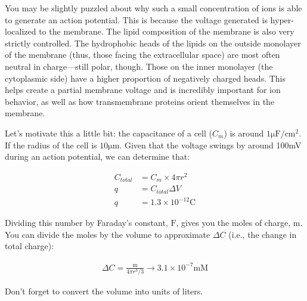 \documentclass[12pt]{report}
\begin{document}
You may be slightly puzzled about why such a small concentration of ions is able to generate an action potential. This is because the voltage generated is hyper-localized to the membrane. The lipid composition of the membrane is also very strictly controlled. The hydrophobic heads of the lipids on the outside monolayer of the membrane (thus, those facing the extracellular space) are most often neutral in charge---still polar, though. Those on the inner monolayer (the cytoplasmic side) have a higher proportion of negatively charged heads. This helps create a partial membrane voltage and is incredibly important for ion behavior, as well as how transmembrane proteins orient themselves in the membrane.\newline

Let's motivate this a little bit: the capacitance of a cell ($C_m$) is around $1\mathrm{\mu F}/\mathrm{cm}^2$. If the radius of the cell is $10\mathrm{\mu m}$. Given that the voltage swings by around 100mV during an action potential, we can determine that:


\begin{equation} \label{smallchange1}
\begin{split}
C_{total} &= C_m \times 4\pi r^2\\
q &= C_{total}\Delta V \\
q &= 1.3 \times 10^{-12}\mathrm{C}
\end{split}
\end{equation}

\bigskip

Dividing this number by Faraday's constant, $\mathrm{F}$, gives you the moles of charge, $\mathrm{m}$. You can divide the moles by the volume to approximate $\Delta C$ (i.e., the change in total charge):

\begin{equation} \label{eq8}
\begin{split}
\Delta C = \frac{\mathrm{m}}{4\pi r^3 /3} \rightarrow 3.1 \times 10^{-7} \mathrm{mM}
\end{split}
\end{equation}

Don't forget to convert the volume into units of liters.\newline
\end{document}
